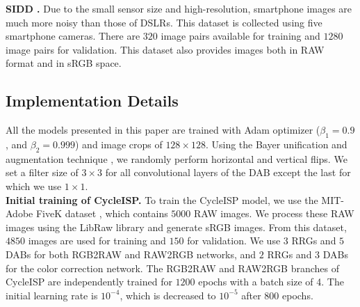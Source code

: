 \documentclass[10pt,twocolumn,letterpaper]{article}
\begin{document}
\vspace{0.4em}\noindent \textbf{SIDD \cite{sidd}.} Due to the small sensor size and high-resolution, smartphone images are much more noisy than those of DSLRs. 
This dataset is collected using five smartphone cameras. 
There are $320$ image pairs available for training and $1280$ image pairs for validation. 
This dataset also provides images both in RAW format and in sRGB space.  




\subsection{Implementation Details}
All the models presented in this paper are trained with Adam optimizer ($\beta_1 = 0.9$, and $\beta_2=0.999$) and image crops of $128\times128$. 
Using the Bayer unification and augmentation technique \cite{liu2019learning}, we randomly perform horizontal and vertical flips. 
We set a filter size of $3\times3$ for all convolutional layers of the DAB except the last for which we use $1\times1$. \vspace{0.4em}\\
\noindent \textbf{Initial training of CycleISP.} To train the CycleISP model, we use the MIT-Adobe FiveK dataset \cite{mit_fivek}, which contains $5000$ RAW images. 
We process these RAW images using the LibRaw library and generate sRGB images. 
From this dataset,
$4850$ images are used for training and $150$ for validation. 
We use $3$ RRGs and $5$ DABs for both RGB2RAW and RAW2RGB networks, and $2$ RRGs and $3$ DABs for the color correction network. 
The RGB2RAW and RAW2RGB branches of CycleISP are independently trained for $1200$ epochs with a batch size of 4. 
The initial learning rate is $10^{-4}$, which is decreased to $10^{-5}$ after $800$ epochs. 
\end{document}
